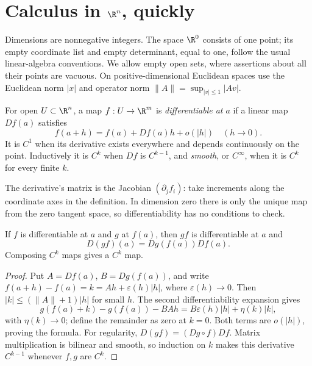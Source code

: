 \section{Calculus in \texorpdfstring{$\R^n$}{R\^{}n}, quickly}

Dimensions are nonnegative integers. The space $\R^0$ consists of one point; its empty coordinate list and empty determinant, equal to one, follow the usual linear-algebra conventions. We allow empty open sets, where assertions about all their points are vacuous. On positive-dimensional Euclidean spaces use the Euclidean norm $|x|$ and operator norm $\|A\|=\sup_{|v|\le1}|Av|$.

\begin{definition}
For open $U\subset\R^n$, a map $f:U\to\R^m$ is \emph{differentiable at $a$} if a linear map $Df(a)$ satisfies
\[
f(a+h)=f(a)+Df(a)h+o(|h|)\quad(h\to0).
\]
It is \emph{$C^1$} when its derivative exists everywhere and depends continuously on the point. Inductively it is \emph{$C^k$} when $Df$ is $C^{k-1}$, and \emph{smooth}, or $C^\infty$, when it is $C^k$ for every finite $k$.
\end{definition}

The derivative's matrix is the Jacobian $(\partial_jf_i)$: take increments along the coordinate axes in the definition. In dimension zero there is only the unique map from the zero tangent space, so differentiability has no conditions to check.

\begin{proposition}\label{prop:chain}
If $f$ is differentiable at $a$ and $g$ at $f(a)$, then $gf$ is differentiable at $a$ and
\[
D(gf)(a)=Dg(f(a))Df(a).
\]
Composing $C^k$ maps gives a $C^k$ map.
\end{proposition}
\begin{proof}
Put $A=Df(a)$, $B=Dg(f(a))$, and write $f(a+h)-f(a)=k=Ah+\varepsilon(h)|h|$, where $\varepsilon(h)\to0$. Then $|k|\le(\|A\|+1)|h|$ for small $h$. The second differentiability expansion gives
\[
g(f(a)+k)-g(f(a))-BAh=B\varepsilon(h)|h|+\eta(k)|k|,
\]
with $\eta(k)\to0$; define the remainder as zero at $k=0$. Both terms are $o(|h|)$, proving the formula. For regularity, $D(gf)=(Dg\circ f)Df$. Matrix multiplication is bilinear and smooth, so induction on $k$ makes this derivative $C^{k-1}$ whenever $f,g$ are $C^k$.
\end{proof}

